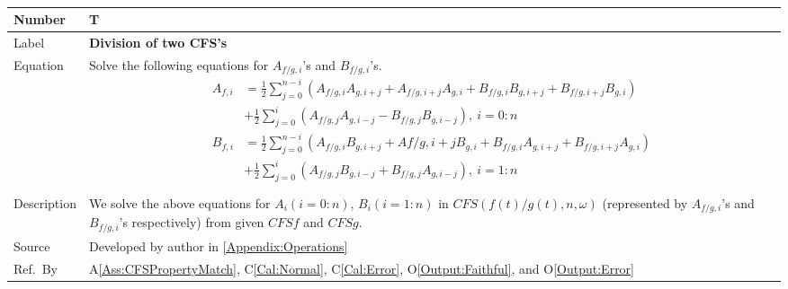 \documentclass[12pt]{article}
\newcommand{\colAwidth}{0.13\textwidth}
\newcommand{\colBwidth}{0.82\textwidth}
\newcounter{theorynum} %
\newcommand{\aref}[1]{A\ref{#1}}
\newcommand{\calref}[1]{C\ref{#1}}
\newcommand{\oref}[1]{O\ref{#1}}
\begin{document}
~\newline
\noindent
\begin{minipage}{\textwidth}
	\renewcommand*{\arraystretch}{1.5}
	\begin{tabular}{| p{\colAwidth} | p{\colBwidth}|}
		\hline
		\rowcolor[gray]{0.9}
		Number& T{theorynum}\thetheorynum \label{T:Division}\\
		\hline
		Label&\bf Division of two CFS's\\
		\hline
		Equation& Solve the following equations for $A_{f/g, i}$'s and $B_{f/g, i}$'s.   
		\begin{equation}
\begin{aligned}
A_{f, i}
&=\frac{1}{2}\sum_{j=0}^{n-i}(A_{f/g,i}A_{g,i+j}+A_{f/g, i+j}A_{g, i}+B_{f/g,i}B_{g,i+j}+B_{f/g,i+j}B_{g,i})\\&+\frac{1}{2}\sum_{j=0}^{i}(A_{f/g,j}A_{g,i-j}-B_{f/g,j}B_{g,i-j}),~i=0:n\\
B_{f, i}
&=\frac{1}{2}\sum_{j=0}^{n-i}(A_{f/g,i}B_{g,i+j}+A{f/g, i+j}B_{g, i}+B_{f/g,i}A_{g,i+j}+B_{f/g,i+j}A_{g,i})\\&+\frac{1}{2}\sum_{j=0}^{i}(A_{f/g,j}B_{g,i-j}+B_{f/g,j}A_{g,i-j}),~i=1:n\\
\end{aligned}
\end{equation}\\
		\hline
		Description & We solve the above equations for $A_i(i=0:n)$, $B_i(i=1:n)$ in $\mathit{CFS}(f(t)/g(t), n, \omega)$ (represented by $A_{f/g, i}$'s and $B_{f/g, i}$'s respectively) from given $\mathit{CFSf}$ and $\mathit{CFSg}$.\\
		
		\hline
		Source & Developed by author in \autoref{Appendix:Operations}\\
		\hline
		Ref.\ By & \aref{Ass:CFSPropertyMatch}, \calref{Cal:Normal}, \calref{Cal:Error}, \oref{Output:Faithful}, and \oref{Output:Error}\\
		\hline
	\end{tabular}
\end{minipage}\\
\end{document}
